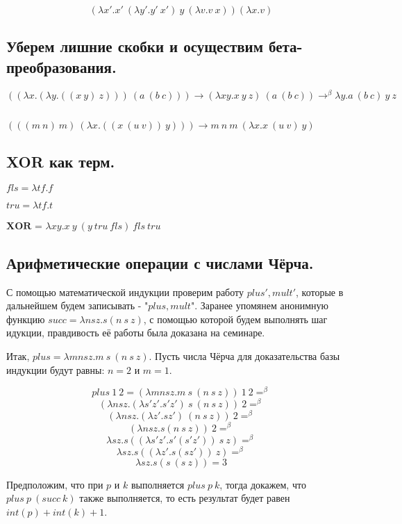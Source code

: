 \documentclass[a4paper,12pt]{article}
\theoremstyle{plain} %
\theoremstyle{definition} %
\theoremstyle{remark} %
\begin{document}
$$(\lambda x'. x' \ (\lambda y'. y' \ x') \ y \ (\lambda v. v \ x)) (\lambda x. v)$$

\subsection{Уберем лишние скобки и осуществим бета-преобразования.}
$((\lambda x. (\lambda y. ((x \ y) \ z))) \ (a \ (b \ c))) \longrightarrow (\lambda x y. x \ y \ z) \ (a \ (b \ c)) \rightarrow^{\beta} \lambda y. a \ (b \ c) \ y \ z$ 

$ $

$(((m \ n) \ m) \ ( \lambda x. ((x \ (u \ v)) \ y))) \longrightarrow m \ n \ m \ ( \lambda x. x \ (u \ v) \ y)$

\subsection{XOR как терм.}

$fls = \lambda t f. f$

$tru = \lambda t f. t$

$\boldsymbol{XOR}$ = $\lambda xy. x \ y \ (y \ tru \ fls) \ fls \ tru$

\subsection{Арифметические операции с числами Чёрча.}

С помощью математической индукции проверим работу $plus', mult'$, которые в дальнейшем будем записывать - "$plus, mult$". Заранее упомянем анонимную функцию $succ = \lambda nsz. s(n \ s \ z)$, с помощью которой будем выполнять шаг идукции, правдивость её работы была доказана на семинаре.

Итак, $plus = \lambda m n s z. m \ s \ (n \ s \ z)$. Пусть числа Чёрча для доказательства базы индукции будут равны: $n = 2$ и $m = 1$. 

$$plus \ 1 \ 2 = (\lambda m n sz. m \ s \ ( n \ s \ z)) \ 1 \ 2 =^{\beta}$$
$$(\lambda n sz. (\lambda s' z'. s'z') \ s \ ( n \ s \ z)) \ 2 =^{\beta}$$
$$(\lambda n sz. (\lambda z'. sz') \ ( n \ s \ z)) \ 2 =^{\beta}$$
$$(\lambda n sz. s ( n \ s \ z)) \ 2 =^{\beta}$$
$$\lambda sz. s ( (\lambda s'z'. s'(s'z')) \ s \ z)=^{\beta}$$
$$\lambda sz. s ( (\lambda z'. s(sz')) \ z)=^{\beta}$$
$$\lambda sz. s ( s \ (s \ z))= 3$$

Предположим, что при $p$ и $k$ выполняется  $plus \ p \ k$, тогда докажем, что $plus \ p \ (succ \ k)$ также выполняется, то есть результат будет равен $int(p) + int(k) + 1$. 
\end{document}
